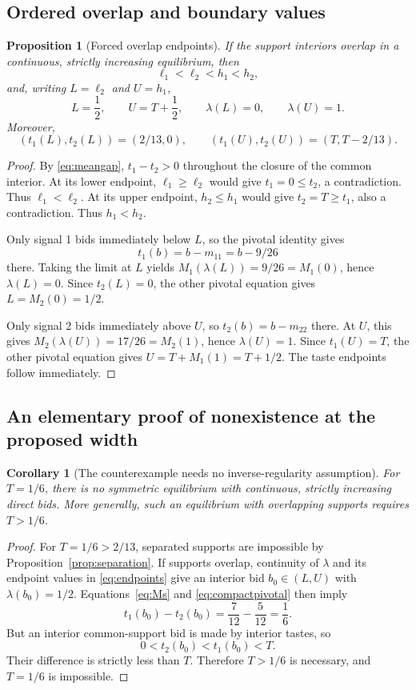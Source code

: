 \documentclass[11pt,a4paper]{article}
\numberwithin{equation}{section}
\newtheorem{proposition}[theorem]{Proposition}
\newtheorem{corollary}[theorem]{Corollary}
\theoremstyle{definition}
\theoremstyle{remark}
\begin{document}
\subsection{Ordered overlap and boundary values}
\begin{proposition}[Forced overlap endpoints]
\label{prop:endpoints}
If the support interiors overlap in a continuous, strictly increasing equilibrium, then
\[
 \ell_1<\ell_2<h_1<h_2,
\]
and, writing $L=\ell_2$ and $U=h_1$,
\begin{equation}
\label{eq:endpoints}
 L=\frac12,\qquad U=T+\frac12,\qquad
 \lambda(L)=0,\qquad\lambda(U)=1.
\end{equation}
Moreover,
\begin{equation}
\label{eq:tasteendpoints}
 (t_1(L),t_2(L))=(2/13,0),\qquad
 (t_1(U),t_2(U))=(T,T-2/13).
\end{equation}
\end{proposition}
\begin{proof}
By \eqref{eq:meangap}, $t_1-t_2>0$ throughout the closure of the common interior. At its lower endpoint, $\ell_1\ge\ell_2$ would give $t_1=0\le t_2$, a contradiction. Thus $\ell_1<\ell_2$. At its upper endpoint, $h_2\le h_1$ would give $t_2=T\ge t_1$, also a contradiction. Thus $h_1<h_2$.

Only signal 1 bids immediately below $L$, so the pivotal identity gives
\[
 t_1(b)=b-m_{11}=b-9/26
\]
there. Taking the limit at $L$ yields $M_1(\lambda(L))=9/26=M_1(0)$, hence $\lambda(L)=0$. Since $t_2(L)=0$, the other pivotal equation gives $L=M_2(0)=1/2$.

Only signal 2 bids immediately above $U$, so $t_2(b)=b-m_{22}$ there. At $U$, this gives $M_2(\lambda(U))=17/26=M_2(1)$, hence $\lambda(U)=1$. Since $t_1(U)=T$, the other pivotal equation gives $U=T+M_1(1)=T+1/2$. The taste endpoints follow immediately.
\end{proof}

\subsection{An elementary proof of nonexistence at the proposed width}
\begin{corollary}[The counterexample needs no inverse-regularity assumption]
\label{cor:elementary}
For $T=1/6$, there is no symmetric equilibrium with continuous, strictly increasing direct bids. More generally, such an equilibrium with overlapping supports requires $T>1/6$.
\end{corollary}
\begin{proof}
For $T=1/6>2/13$, separated supports are impossible by Proposition~\ref{prop:separation}. If supports overlap, continuity of $\lambda$ and its endpoint values in \eqref{eq:endpoints} give an interior bid $b_0\in(L,U)$ with $\lambda(b_0)=1/2$. Equations~\eqref{eq:Ms} and \eqref{eq:compactpivotal} then imply
\[
 t_1(b_0)-t_2(b_0)
 =\frac7{12}-\frac5{12}=\frac16.
\]
But an interior common-support bid is made by interior tastes, so
\[
 0<t_2(b_0)<t_1(b_0)<T.
\]
Their difference is strictly less than $T$. Therefore $T>1/6$ is necessary, and $T=1/6$ is impossible.
\end{proof}
\end{document}
